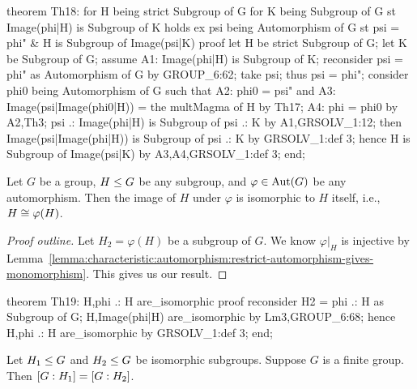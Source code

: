 \nwenddocs{}\endmoddef\nwstartdeflinemarkup{}\nwenddeflinemarkup
theorem Th18:
  for H being strict Subgroup of G
  for K being Subgroup of G
  st Image(phi|H) is Subgroup of K
  holds ex psi being Automorphism of G
  st psi = phi" & H is Subgroup of Image(psi|K)
proof
  let H be strict Subgroup of G;
  let K be Subgroup of G;
  assume A1: Image(phi|H) is Subgroup of K;
  reconsider psi = phi" as Automorphism of G by GROUP_6:62;
  take psi;
  thus psi = phi";
  consider phi0 being Automorphism of G such that
  A2: phi0 = psi" and
  A3: Image(psi|Image(phi0|H)) = the multMagma of H
  by Th17;
  A4: phi = phi0 by A2,Th3;
  psi .: Image(phi|H) is Subgroup of psi .: K by A1,GRSOLV_1:12;
  then Image(psi|Image(phi|H)) is Subgroup of psi .: K by GRSOLV_1:def 3;
  hence H is Subgroup of Image(psi|K) by A3,A4,GRSOLV_1:def 3;
end;
\eatline
{}\nwendcode{}\nwdocspar
\begin{theorem}
Let $G$ be a group, $H\leq G$ be any subgroup, and
$\varphi\in\operatorname{Aut}(G)$ be any automorphism. Then the image of $H$ under
$\varphi$ is isomorphic to $H$ itself, i.e., $H\cong\varphi(H)$.
\end{theorem}

\begin{proof}[Proof outline]
Let $H_{2}=\varphi(H)$ be a subgroup of $G$. We know $\varphi|_{H}$ is
injective by Lemma~\ref{lemma:characteristic:automorphism:restrict-automorphism-gives-monomorphism}. This gives us our result.
\end{proof}

\nwenddocs{}\endmoddef\nwstartdeflinemarkup{}\nwenddeflinemarkup
theorem Th19:
  H,phi .: H are_isomorphic
proof
  reconsider H2 = phi .: H as Subgroup of G;
  H,Image(phi|H) are_isomorphic by Lm3,GROUP_6:68;
  hence H,phi .: H are_isomorphic by GRSOLV_1:def 3;
end;
\eatline
{}\nwendcode{}\nwdocspar
\begin{theorem}
Let $H_{1}\leq G$ and $H_{2}\leq G$ be isomorphic
subgroups. Suppose $G$ is a finite group. Then $[G : H_{1}]=[G : H_{2}]$.
\end{theorem}

